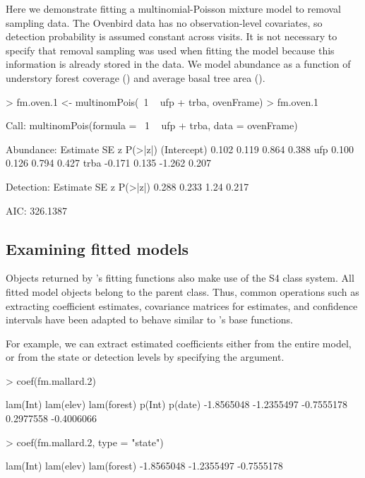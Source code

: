 \documentclass[article,shortnames]{jss}
\newcommand{\um}{\pkg{unmarked}}
\newcommand{\rlang}{\proglang{R}}
\begin{document}
{Here we demonstrate fitting a multinomial-Poisson mixture model to removal 
sampling data.  The Ovenbird data has no observation-level covariates, so 
detection probability is assumed constant across visits.  It is not necessary
to specify that removal sampling was used when fitting the model
because this information is already stored in the  data.
We model abundance as a function of understory forest coverage ()
and average basal tree area ().

\begin{Schunk}
\begin{Sinput}
> fm.oven.1 <- multinomPois(~1 ~ ufp + trba, ovenFrame)
> fm.oven.1
\end{Sinput}
\begin{Soutput}
Call:
multinomPois(formula = ~1 ~ ufp + trba, data = ovenFrame)

Abundance:
            Estimate    SE      z P(>|z|)
(Intercept)    0.102 0.119  0.864   0.388
ufp            0.100 0.126  0.794   0.427
trba          -0.171 0.135 -1.262   0.207

Detection:
 Estimate    SE    z P(>|z|)
    0.288 0.233 1.24   0.217

AIC: 326.1387 
\end{Soutput}
\end{Schunk}


\subsection{Examining fitted models}
\label{sec:examining-model-fits}

Objects returned by \um's fitting functions also make use of the S4
class system.  All fitted model objects belong to the  
parent class.  Thus, common operations such as extracting coefficient
estimates, covariance matrices for estimates, and confidence intervals
have been adapted to behave similar to \rlang's base functions.

For example, we can extract estimated coefficients either from the
entire model, or from the state or detection levels by specifying the
 argument.

\begin{Schunk}
\begin{Sinput}
> coef(fm.mallard.2)
\end{Sinput}
\begin{Soutput}
   lam(Int)   lam(elev) lam(forest)      p(Int)     p(date) 
 -1.8565048  -1.2355497  -0.7555178   0.2977558  -0.4006066 
\end{Soutput}
\begin{Sinput}
> coef(fm.mallard.2, type = "state")
\end{Sinput}
\begin{Soutput}
   lam(Int)   lam(elev) lam(forest) 
 -1.8565048  -1.2355497  -0.7555178 
\end{Soutput}
\end{Schunk}

}
\end{document}
